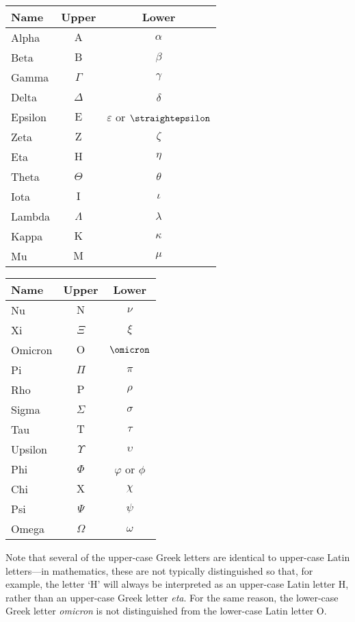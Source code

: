 \begin{center}
\begin{tabular}{l|cc}
\textbf{Name} & \textbf{Upper} & \textbf{Lower}  \\ \hline
\small Alpha   & $\mathrm{A}$ & $\alpha$ \\
\small Beta    & $\mathrm{B}$ & $\beta$ \\
\small Gamma   & $\Gamma$     & $\gamma$ \\
\small Delta   & $\Delta$     & $\delta$ \\
\small Epsilon & $\mathrm{E}$ & $\varepsilon$ or $\text{\straightepsilon}$ \\
\small Zeta    & $\mathrm{Z}$ & $\zeta$ \\
\small Eta     & $\mathrm{H}$ & $\eta$ \\
\small Theta   & $\Theta$     & $\theta$ \\
\small Iota    & $\mathrm{I}$ & $\iota$ \\
\small Lambda  & $\Lambda$    & $\lambda$ \\
\small Kappa   & $\mathrm{K}$ & $\kappa$ \\
\small Mu      & $\mathrm{M}$ & $\mu$ 
\end{tabular}
%
\hspace{20pt}
%
\begin{tabular}{l|cc}
\textbf{Name} & \textbf{Upper} & \textbf{Lower}  \\ \hline
\small Nu      & $\mathrm{N}$ & $\nu$ \\
\small Xi      & $\Xi$        & $\xi$ \\
\small Omicron & $\mathrm{O}$ & $\omicron$ \\
\small Pi      & $\Pi$        & $\pi$ \\
\small Rho     & $\mathrm{P}$ & $\rho$ \\
\small Sigma   & $\Sigma$     & $\sigma$ \\
\small Tau     & $\mathrm{T}$ & $\tau$ \\
\small Upsilon & $\Upsilon$   & $\upsilon$ \\
\small Phi     & $\Phi$       & $\varphi$ or $\phi$ \\
\small Chi     & $\mathrm{X}$ & $\chi$ \\
\small Psi     & $\Psi$       & $\psi$ \\
\small Omega   & $\Omega$     & $\omega$
\end{tabular}
\end{center}

Note that several of the upper-case Greek letters are identical to upper-case Latin letters---in mathematics, these are not typically distinguished so that, for example, the letter `H' will always be interpreted as an upper-case Latin letter H, rather than an upper-case Greek letter \textit{eta}. For the same reason, the lower-case Greek letter \textit{omicron} is not distinguished from the lower-case Latin letter O.

